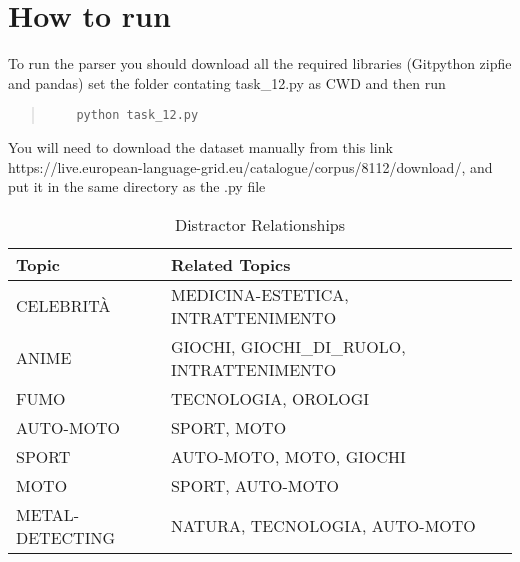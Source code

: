 \documentclass[11pt]{article}
\begin{document}
\section{How to run}
To run the parser you should download all the required libraries (Gitpython zipfie and pandas) set the folder contating 
task\_12.py as CWD and then run
\begin{quote}
  \begin{verbatim}
    python task_12.py
  \end{verbatim}
\end{quote}
\noindent You will need to download the dataset manually from this link https://live.european-language-grid.eu/catalogue/corpus/8112/download/,
and put it in the same directory as the .py file
\begin{table*}
  \centering
  \caption{Distractor Relationships}
  \label{tab:distractor}
  \begin{tabular}{lll}
  \hline
  \textbf{Topic}           & \textbf{Related Topics}                                                                                                                         \\ \hline
  CELEBRITÀ                & MEDICINA-ESTETICA, INTRATTENIMENTO                                                                                                                   \\ \hline
  ANIME                    & GIOCHI, GIOCHI\_DI\_RUOLO, INTRATTENIMENTO                                                                                                           \\ \hline
  FUMO                     & TECNOLOGIA, OROLOGI                                                                                                                                  \\ \hline
  AUTO-MOTO                & SPORT, MOTO                                                                                                                                           \\ \hline
  SPORT                    & AUTO-MOTO, MOTO, GIOCHI                                                                                                                              \\ \hline
  MOTO                     & SPORT, AUTO-MOTO                                                                                                                                      \\ \hline
  METAL-DETECTING          & NATURA, TECNOLOGIA, AUTO-MOTO                                                                                                                         \\ \hline

\end{tabular}
\end{table*}
\end{document}
